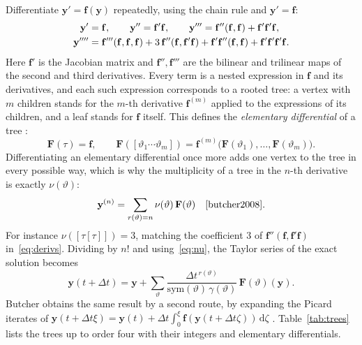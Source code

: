 \documentclass[11pt,a4paper]{article}
\newcommand{\dd}{\mathrm{d}}
\newcommand{\Dt}{\Delta t}
\newcommand{\bfy}{\mathbf{y}}
\newcommand{\bff}{\mathbf{f}}
\begin{document}
Differentiate $\bfy'=\bff(\bfy)$ repeatedly, using the chain rule and $\bfy'=\bff$:
\begin{align}
\bfy'&=\bff,\qquad \bfy''=\bff'\bff,\qquad \bfy'''=\bff''(\bff,\bff)+\bff'\bff'\bff,\notag\\
\bfy''''&=\bff'''(\bff,\bff,\bff)+3\,\bff''(\bff,\bff'\bff)+\bff'\bff''(\bff,\bff)+\bff'\bff'\bff'\bff .
\label{eq:derivs}
\end{align}
Here $\bff'$ is the Jacobian matrix and $\bff'',\bff'''$ are the bilinear and trilinear maps of the second
and third derivatives. Every term is a nested expression in $\bff$ and its derivatives, and each such
expression corresponds to a rooted tree: a vertex with $m$ children stands for the $m$-th derivative
$\bff^{(m)}$ applied to the expressions of its children, and a leaf stands for $\bff$ itself. This defines the
\emph{elementary differential} of a tree \cite[Sect.~310]{butcher2008}:
\begin{equation}
\mathbf F(\tau)=\bff,\qquad
\mathbf F([\vartheta_1\cdots\vartheta_m])=\bff^{(m)}\bigl(\mathbf F(\vartheta_1),\dots,\mathbf F(\vartheta_m)\bigr).
\end{equation}
Differentiating an elementary differential once more adds one vertex to the tree in every possible way,
which is why the multiplicity of a tree in the $n$-th derivative is exactly $\nu(\vartheta)$:
\begin{equation}
\bfy^{(n)}=\sum_{r(\vartheta)=n}\nu(\vartheta)\,\mathbf F(\vartheta)\quad\text{\cite[Thm.~311C]{butcher2008}.}
\end{equation}
For instance $\nu([\tau[\tau]])=3$, matching the coefficient $3$ of $\bff''(\bff,\bff'\bff)$ in~\eqref{eq:derivs}.
Dividing by $n!$ and using~\eqref{eq:nu}, the Taylor series of the exact solution becomes
\begin{equation}
\bfy(t+\Dt)=\bfy+\sum_{\vartheta}\frac{\Dt^{\,r(\vartheta)}}{\mathrm{sym}(\vartheta)\,\gamma(\vartheta)}\,\mathbf F(\vartheta)(\bfy).
\label{eq:exacttaylor}
\end{equation}
Butcher obtains the same result by a second route, by expanding the Picard iterates of
$\bfy(t+\Dt\xi)=\bfy(t)+\Dt\int_0^\xi\bff(\bfy(t+\Dt\zeta))\,\dd\zeta$ \cite[Thm.~311D]{butcher2008}.
Table~\ref{tab:trees} lists the trees up to order four with their integers and elementary differentials.
\end{document}
